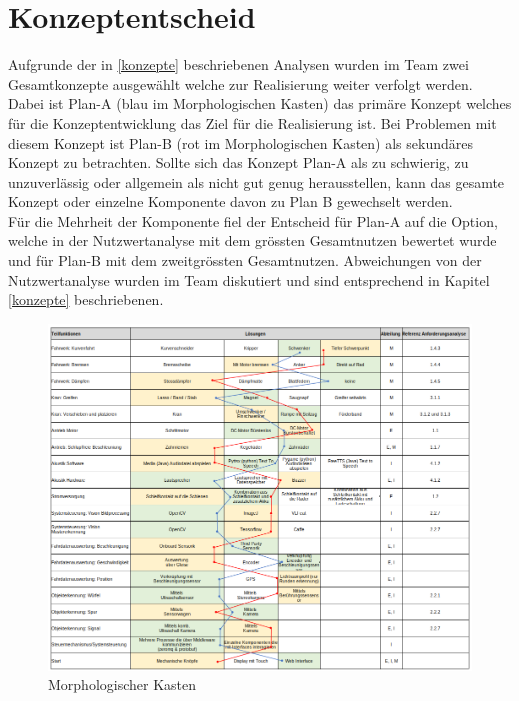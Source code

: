 \documentclass[11pt]{scrartcl}
\begin{document}
       


        \section{Konzeptentscheid}
        Aufgrunde der in \ref{konzepte} beschriebenen Analysen wurden im Team zwei Gesamtkonzepte ausgewählt welche zur Realisierung weiter verfolgt werden. Dabei ist Plan-A (blau im Morphologischen Kasten) das primäre Konzept welches für die Konzeptentwicklung das Ziel für die Realisierung ist. Bei Problemen mit diesem Konzept ist Plan-B (rot im Morphologischen Kasten) als sekundäres Konzept zu betrachten. Sollte sich das Konzept Plan-A als zu schwierig, zu unzuverlässig oder allgemein als nicht gut genug herausstellen, kann das gesamte Konzept oder einzelne Komponente davon zu Plan B gewechselt werden.\\
        Für die Mehrheit der Komponente fiel der Entscheid für Plan-A auf die Option, welche in der Nutzwertanalyse mit dem grössten Gesamtnutzen bewertet wurde und für Plan-B mit dem zweitgrössten Gesamtnutzen. Abweichungen von der Nutzwertanalyse wurden im Team diskutiert und sind entsprechend in Kapitel \ref{konzepte} beschriebenen. 

        \vspace{1.5cm}

        \begin{flushleft}
        \begin{figure}[H]
            \includegraphics[width=1\textwidth]{morphologischer_Kasten.png}
            \caption{Morphologischer Kasten}
            \label{fig:morph}
        \end{figure}
        \end{flushleft}
\end{document}
